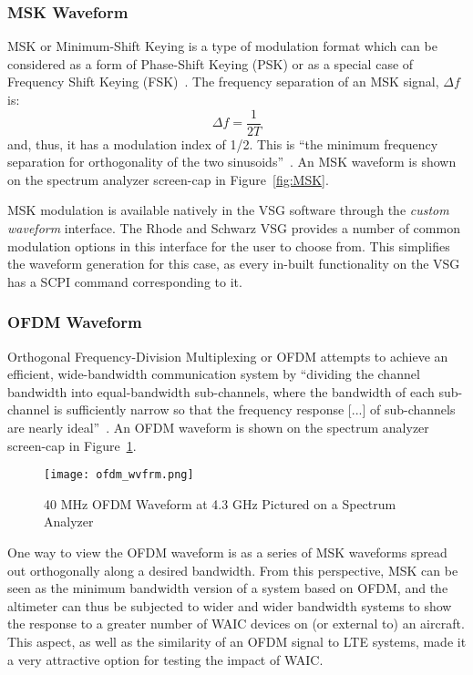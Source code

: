 \subsubsection{MSK Waveform}\label{subsub:MSK}
MSK or Minimum-Shift Keying is a type of modulation format which can be considered as a form of Phase-Shift Keying (PSK) or as a special case of Frequency Shift Keying (FSK)~\cite{proakis_communication_2002}. The frequency separation of an MSK signal, $\Delta f$ is:
$$ \Delta f = \frac{1}{2T}$$
and, thus, it has a modulation index of 1/2. This is ``the minimum frequency separation for orthogonality of the two sinusoids''~\cite{proakis_communication_2002}. An MSK waveform is shown on the spectrum analyzer screen-cap in Figure~\ref{fig:MSK}.

MSK modulation is available natively in the VSG software through the \textit{custom waveform} interface.  The Rhode and Schwarz VSG provides a number of common modulation options in this interface for the user to choose from. This simplifies the waveform generation for this case, as every in-built functionality on the VSG has a SCPI command corresponding to it. 


\subsubsection{OFDM Waveform}\label{subsub:OFDM}

Orthogonal Frequency-Division Multiplexing or OFDM attempts to achieve an efficient, wide-bandwidth communication system by ``dividing the channel bandwidth into equal-bandwidth sub-channels, where the bandwidth of each sub-channel is sufficiently narrow so that the frequency response [...] of sub-channels are nearly ideal''~\cite{proakis_communication_2002}. An OFDM waveform is shown on the spectrum analyzer screen-cap in Figure~\ref{fig:OFDM}.
\begin{figure}[ht]
\centering
\texttt{[image: ofdm\_wvfrm.png]}
\caption{40 MHz OFDM Waveform at 4.3 GHz Pictured on a Spectrum Analyzer}

\label{fig:OFDM}

\end{figure}
One way to view the OFDM waveform is as a series of MSK waveforms spread out orthogonally along a desired bandwidth. From this perspective, MSK can be seen as the minimum bandwidth version of a system based on OFDM, and the altimeter can thus be subjected to wider and wider bandwidth systems to show the response to a greater number of WAIC devices on (or external to) an aircraft. This aspect, as well as the similarity of an OFDM signal to LTE systems, made it a very attractive option for testing the impact of WAIC. 

